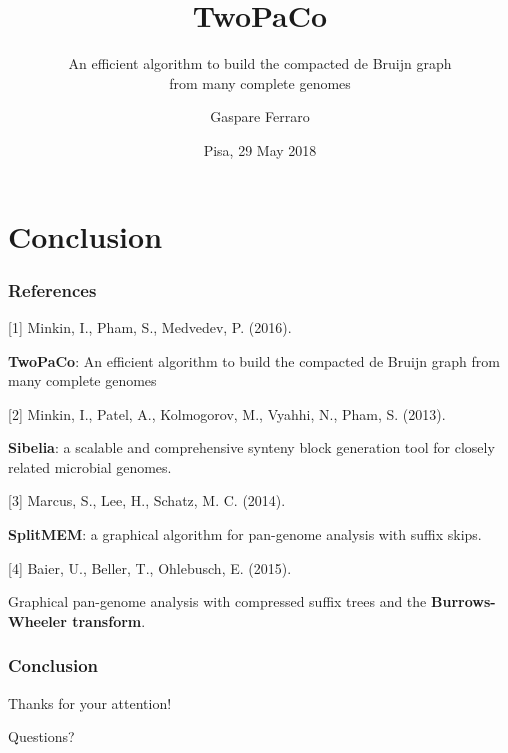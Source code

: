 \documentclass[11pt,svgnames,smaller]{beamer}
\author{Gaspare Ferraro}
\institute[University of Pisa]{University of Pisa\\Department of Computer Science}
\title{TwoPaCo}
\subtitle{An efficient algorithm to build the compacted de Bruijn graph\\from many complete genomes}
\date{Pisa, 29 May 2018}
\begin{document}
	

	\begin{frame} 
	\titlepage
	\end{frame}
			
	
	
	
	
	\section{Conclusion}
	
	\begin{frame}
  \frametitle{References}
  
  [1] Minkin, I., Pham, S., Medvedev, P. (2016). 
  
  \textbf{TwoPaCo}: An efficient algorithm to build the compacted de Bruijn graph from many complete genomes	  

  \medskip
  
  [2] Minkin, I., Patel, A., Kolmogorov, M., Vyahhi, N., Pham, S. (2013). 
  
  \textbf{Sibelia}: a scalable and comprehensive synteny block generation tool for closely related microbial
genomes.

  \medskip
  
  [3] Marcus, S., Lee, H., Schatz, M. C. (2014). 
  
  \textbf{SplitMEM}: a graphical algorithm for pan-genome analysis with suffix skips.

  \medskip

  [4] Baier, U., Beller, T., Ohlebusch, E. (2015). 
  
  Graphical pan-genome analysis with compressed suffix trees and the \textbf{Burrows-Wheeler transform}.


	\end{frame}

	\begin{frame}
		\frametitle{Conclusion}
		\centering
		\Large
		Thanks for your attention!
		
		\bigskip
		
		Questions?
 	\end{frame}
  
\end{document}

